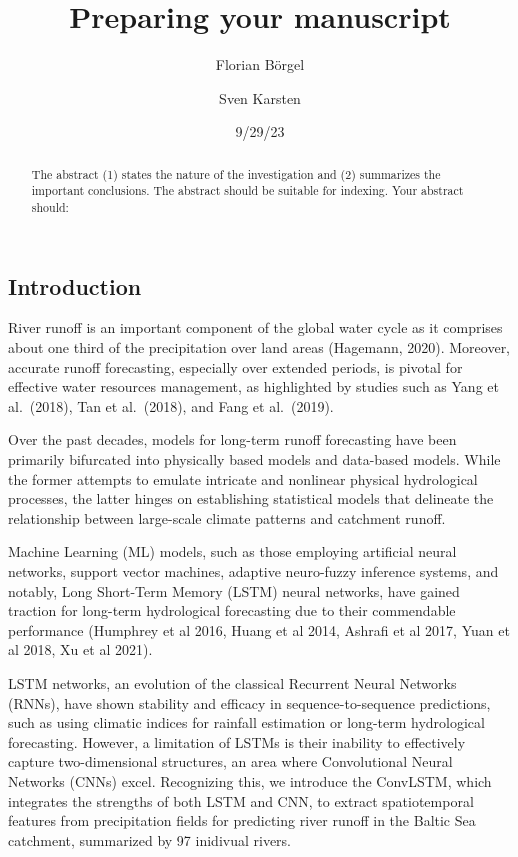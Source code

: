 \documentclass[
  letterpaper,
  DIV=11,
  numbers=noendperiod]{scrartcl}
\title{Preparing your manuscript}
\author{Florian Börgel \and Sven Karsten}
\date{9/29/23}
\begin{document}
\maketitle
\begin{abstract}
The abstract (1) states the nature of the investigation and (2)
summarizes the important conclusions. The abstract should be suitable
for indexing. Your abstract should:
\end{abstract}
\ifdefined\Shaded\renewenvironment{Shaded}{\begin{tcolorbox}[breakable, enhanced, frame hidden, borderline west={3pt}{0pt}{shadecolor}, interior hidden, boxrule=0pt, sharp corners]}{\end{tcolorbox}}\fi

\hypertarget{introduction}{%
\subsection{Introduction}\label{introduction}}

River runoff is an important component of the global water cycle as it
comprises about one third of the precipitation over land areas
(Hagemann, 2020). Moreover, accurate runoff forecasting, especially over
extended periods, is pivotal for effective water resources management,
as highlighted by studies such as Yang et al.~(2018), Tan et al.~(2018),
and Fang et al.~(2019).

Over the past decades, models for long-term runoff forecasting have been
primarily bifurcated into physically based models and data-based models.
While the former attempts to emulate intricate and nonlinear physical
hydrological processes, the latter hinges on establishing statistical
models that delineate the relationship between large-scale climate
patterns and catchment runoff.

Machine Learning (ML) models, such as those employing artificial neural
networks, support vector machines, adaptive neuro-fuzzy inference
systems, and notably, Long Short-Term Memory (LSTM) neural networks,
have gained traction for long-term hydrological forecasting due to their
commendable performance (Humphrey et al 2016, Huang et al 2014, Ashrafi
et al 2017, Yuan et al 2018, Xu et al 2021).

LSTM networks, an evolution of the classical Recurrent Neural Networks
(RNNs), have shown stability and efficacy in sequence-to-sequence
predictions, such as using climatic indices for rainfall estimation or
long-term hydrological forecasting. However, a limitation of LSTMs is
their inability to effectively capture two-dimensional structures, an
area where Convolutional Neural Networks (CNNs) excel. Recognizing this,
we introduce the ConvLSTM, which integrates the strengths of both LSTM
and CNN, to extract spatiotemporal features from precipitation fields
for predicting river runoff in the Baltic Sea catchment, summarized by
97 inidivual rivers.
\end{document}
